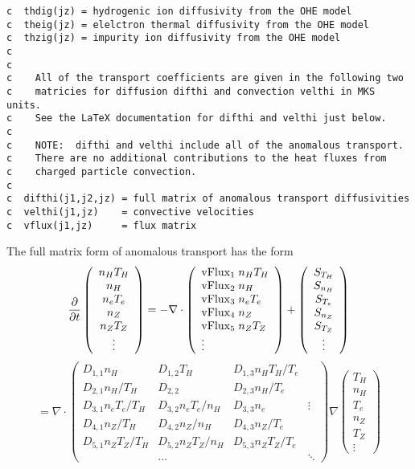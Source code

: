 \begin{verbatim}
c  thdig(jz) = hydrogenic ion diffusivity from the OHE model
c  theig(jz) = elelctron thermal diffusivity from the OHE model
c  thzig(jz) = impurity ion diffusivity from the OHE model
c	    
c
c    All of the transport coefficients are given in the following two
c    matricies for diffusion difthi and convection velthi in MKS units.
c    See the LaTeX documentation for difthi and velthi just below.
c
c    NOTE:  difthi and velthi include all of the anomalous transport.
c    There are no additional contributions to the heat fluxes from
c    charged particle convection.
c
c  difthi(j1,j2,jz) = full matrix of anomalous transport diffusivities
c  velthi(j1,jz)    = convective velocities
c  vflux(j1,jz)     = flux matrix
\end{verbatim}

The full matrix form of anomalous transport has the form
$$ \frac{\partial}{\partial t}
 \left( \begin{array}{c} n_H T_H  \\ n_H \\ n_e T_e \\
    n_Z \\ n_Z T_Z \\ \vdots
    \end{array} \right)
 = - \nabla \cdot
\left( \begin{array}{l} {\rm vFlux}_1 \; n_H T_H \\
 {\rm vFlux}_2 \; n_H \\
 {\rm vFlux}_3 \; n_e T_e \\
 {\rm vFlux}_4 \; n_Z \\
 {\rm vFlux}_5 \; n_Z T_Z \\
 \vdots \end{array} \right) 
 + \left( \begin{array}{c} S_{T_H} \\ S_{n_H} \\ S_{T_e} \\
    S_{n_Z} \\ S_{T_Z} \\ \vdots
    \end{array} \right)
$$
$$
 = \nabla \cdot
\left( \begin{array}{llll}
D_{1,1} n_H & D_{1,2} T_H & D_{1,3} n_H T_H / T_e \\
D_{2,1} n_H / T_H & D_{2,2} & D_{2,3} n_H / T_e \\
D_{3,1} n_e T_e / T_H & D_{3,2} n_e T_e / n_H & D_{3,3} n_e & \vdots \\
D_{4,1} n_Z / T_H & D_{4,2} n_Z / n_H & D_{4,3} n_Z / T_e \\
D_{5,1} n_Z T_Z / T_H & D_{5,2} n_Z T_Z / n_H &
        D_{5,3} n_Z T_Z / T_e \\
 & \ldots & & \ddots
\end{array} \right)
 \nabla
 \left( \begin{array}{c}  T_H \\ n_H \\  T_e \\
   n_Z \\  T_Z \\ \vdots
    \end{array} \right)
$$
